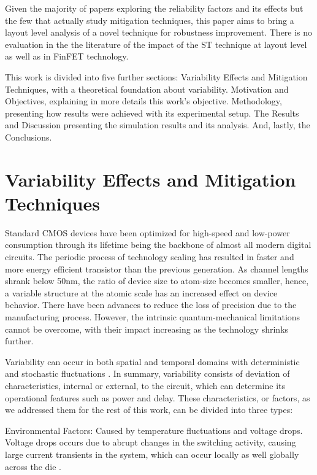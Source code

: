 \documentclass[ecp,tc, english]{iiufrgs}
\begin{document}
Given the majority of papers exploring the reliability factors and its effects but the few that actually study mitigation techniques, this paper aims to bring a layout level analysis of a novel technique for robustness improvement. There is no evaluation in the the literature of the impact of the ST technique at layout level as well as in FinFET technology.

This work is divided into five further sections: Variability Effects and Mitigation Techniques, with a theoretical foundation about variability. Motivation and Objectives, explaining in more details this work’s objective. Methodology, presenting how results were achieved with its experimental setup. The Results and Discussion presenting the simulation results and its analysis. And, lastly, the Conclusions.

\chapter{Variability Effects and Mitigation Techniques}

Standard CMOS devices have been optimized for high-speed and low-power consumption through its lifetime being the backbone of almost all modern digital circuits. The periodic process of technology scaling has resulted in faster and more energy efficient transistor than the previous generation. As channel lengths shrank below 50nm, the ratio of device size to atom-size becomes smaller, hence, a variable structure at the atomic scale has an increased effect on device behavior. There have been advances to reduce the loss of precision due to the manufacturing process. However, the intrinsic quantum-mechanical limitations cannot be overcome, with their impact increasing as the technology shrinks further. 

Variability can occur in both spatial and temporal domains with deterministic and stochastic fluctuations \cite{walker2010optimizing}. In summary, variability consists of deviation of characteristics, internal or external, to the circuit, which can determine its operational features such as power and delay. These characteristics, or factors, as we addressed them for the rest of this work, can be divided into three types: 
 
Environmental Factors:  
Caused by temperature fluctuations and voltage drops. Voltage drops occurs due to abrupt changes in the switching activity, causing large current transients in the system, which can occur locally as well globally across the die \cite{nassif:08}. 
 
\end{document}
